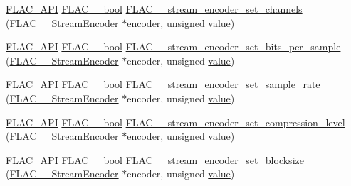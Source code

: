 \begin{DoxyCompactItemize}
\item 
\hyperlink{group__flac__export_ga56ca07df8a23310707732b1c0007d6f5}{F\+L\+A\+C\+\_\+\+A\+PI} \hyperlink{ordinals_8h_a95103469f1cbd78b8cf250194985b34e}{F\+L\+A\+C\+\_\+\+\_\+bool} \hyperlink{group__flac__stream__encoder_gabfc9c883c124a849b5b42a87c30e10a5}{F\+L\+A\+C\+\_\+\+\_\+stream\+\_\+encoder\+\_\+set\+\_\+channels} (\hyperlink{struct_f_l_a_c_____stream_encoder}{F\+L\+A\+C\+\_\+\+\_\+\+Stream\+Encoder} $\ast$encoder, unsigned \hyperlink{lib_2expat_8h_a4a30a13b813682e68c5b689b45c65971}{value})
\item 
\hyperlink{group__flac__export_ga56ca07df8a23310707732b1c0007d6f5}{F\+L\+A\+C\+\_\+\+A\+PI} \hyperlink{ordinals_8h_a95103469f1cbd78b8cf250194985b34e}{F\+L\+A\+C\+\_\+\+\_\+bool} \hyperlink{group__flac__stream__encoder_ga5a21cf7f86a81df6ba72714a6b917aa3}{F\+L\+A\+C\+\_\+\+\_\+stream\+\_\+encoder\+\_\+set\+\_\+bits\+\_\+per\+\_\+sample} (\hyperlink{struct_f_l_a_c_____stream_encoder}{F\+L\+A\+C\+\_\+\+\_\+\+Stream\+Encoder} $\ast$encoder, unsigned \hyperlink{lib_2expat_8h_a4a30a13b813682e68c5b689b45c65971}{value})
\item 
\hyperlink{group__flac__export_ga56ca07df8a23310707732b1c0007d6f5}{F\+L\+A\+C\+\_\+\+A\+PI} \hyperlink{ordinals_8h_a95103469f1cbd78b8cf250194985b34e}{F\+L\+A\+C\+\_\+\+\_\+bool} \hyperlink{group__flac__stream__encoder_ga108c3f4fbdcaa744ddbb125f91cb3838}{F\+L\+A\+C\+\_\+\+\_\+stream\+\_\+encoder\+\_\+set\+\_\+sample\+\_\+rate} (\hyperlink{struct_f_l_a_c_____stream_encoder}{F\+L\+A\+C\+\_\+\+\_\+\+Stream\+Encoder} $\ast$encoder, unsigned \hyperlink{lib_2expat_8h_a4a30a13b813682e68c5b689b45c65971}{value})
\item 
\hyperlink{group__flac__export_ga56ca07df8a23310707732b1c0007d6f5}{F\+L\+A\+C\+\_\+\+A\+PI} \hyperlink{ordinals_8h_a95103469f1cbd78b8cf250194985b34e}{F\+L\+A\+C\+\_\+\+\_\+bool} \hyperlink{group__flac__stream__encoder_ga03495bcd0aae71116c701b0dcf311c4b}{F\+L\+A\+C\+\_\+\+\_\+stream\+\_\+encoder\+\_\+set\+\_\+compression\+\_\+level} (\hyperlink{struct_f_l_a_c_____stream_encoder}{F\+L\+A\+C\+\_\+\+\_\+\+Stream\+Encoder} $\ast$encoder, unsigned \hyperlink{lib_2expat_8h_a4a30a13b813682e68c5b689b45c65971}{value})
\item 
\hyperlink{group__flac__export_ga56ca07df8a23310707732b1c0007d6f5}{F\+L\+A\+C\+\_\+\+A\+PI} \hyperlink{ordinals_8h_a95103469f1cbd78b8cf250194985b34e}{F\+L\+A\+C\+\_\+\+\_\+bool} \hyperlink{group__flac__stream__encoder_gae6c001cd7601192334c58ee3631b571f}{F\+L\+A\+C\+\_\+\+\_\+stream\+\_\+encoder\+\_\+set\+\_\+blocksize} (\hyperlink{struct_f_l_a_c_____stream_encoder}{F\+L\+A\+C\+\_\+\+\_\+\+Stream\+Encoder} $\ast$encoder, unsigned \hyperlink{lib_2expat_8h_a4a30a13b813682e68c5b689b45c65971}{value})

\end{DoxyCompactItemize}

